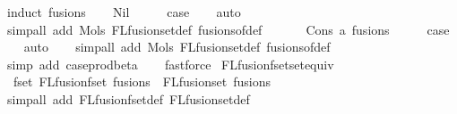 \begin{isabellebody}
%
\isadelimproof
%
\endisadelimproof
%
\isatagproof
{}\isamarkupfalse%
\ {\isacharparenleft}{\kern0pt}induct\ fusions{\isacharparenright}{\kern0pt}\isanewline
\ \ \isamarkupfalse%
\ Nil\isanewline
\ \ \isamarkupfalse%
\ \isamarkupfalse%
\ {\isacharquery}{\kern0pt}case\isanewline
\ \ \isamarkupfalse%
\ auto\isanewline
\ \ \isamarkupfalse%
\ {\isacharparenleft}{\kern0pt}simp{\isacharunderscore}{\kern0pt}all\ add{\isacharcolon}{\kern0pt}\ Mols{}\ FLfusion{\isacharunderscore}{\kern0pt}set{\isacharunderscore}{\kern0pt}def\ fusions{\isacharunderscore}{\kern0pt}of{\isacharunderscore}{\kern0pt}def{\isacharparenright}{\kern0pt}\isanewline
\ \ \isamarkupfalse%
\isanewline
{}\isamarkupfalse%
\isanewline
\ \ \isamarkupfalse%
\ {\isacharparenleft}{\kern0pt}Cons\ a\ fusions{\isacharparenright}{\kern0pt}\isanewline
\ \ \isamarkupfalse%
\ \isamarkupfalse%
\ {\isacharquery}{\kern0pt}case\isanewline
\ \ \isamarkupfalse%
\ auto\isanewline
\ \ \isamarkupfalse%
\ {\isacharparenleft}{\kern0pt}simp{\isacharunderscore}{\kern0pt}all\ add{\isacharcolon}{\kern0pt}\ Mols{}\ FLfusion{\isacharunderscore}{\kern0pt}set{\isacharunderscore}{\kern0pt}def\ fusions{\isacharunderscore}{\kern0pt}of{\isacharunderscore}{\kern0pt}def{\isacharparenright}{\kern0pt}\isanewline
\ \ \isamarkupfalse%
\ {\isacharparenleft}{\kern0pt}simp\ add{\isacharcolon}{\kern0pt}\ case{\isacharunderscore}{\kern0pt}prod{\isacharunderscore}{\kern0pt}beta{\isacharparenright}{\kern0pt}\isanewline
\ \ \isamarkupfalse%
\ fastforce\isanewline
{}\isamarkupfalse%
%
\endisatagproof
{\isafoldproof}%
%
\isadelimproof
\isanewline
%
\endisadelimproof
\isanewline
\isanewline
{}\isamarkupfalse%
\ FLfusion{\isacharunderscore}{\kern0pt}fset{\isacharunderscore}{\kern0pt}set{\isacharunderscore}{\kern0pt}equiv{\isacharcolon}{\kern0pt}\isanewline
\ \ {\isachardoublequoteopen}fset\ {\isacharparenleft}{\kern0pt}FLfusion{\isacharunderscore}{\kern0pt}fset\ fusions{\isacharparenright}{\kern0pt}\ {\isacharequal}{\kern0pt}\ FLfusion{\isacharunderscore}{\kern0pt}set\ fusions{\isachardoublequoteclose}\isanewline
%
\isadelimproof
%
\endisadelimproof
%
\isatagproof
{}\isamarkupfalse%
\ {\isacharparenleft}{\kern0pt}simp{\isacharunderscore}{\kern0pt}all\ add{\isacharcolon}{\kern0pt}\ FLfusion{\isacharunderscore}{\kern0pt}fset{\isacharunderscore}{\kern0pt}def\ FLfusion{\isacharunderscore}{\kern0pt}set{\isacharunderscore}{\kern0pt}def{\isacharparenright}{\kern0pt}\isanewline

\end{isabellebody}
